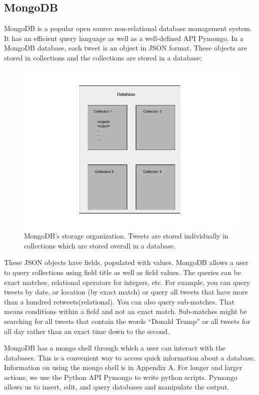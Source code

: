 \documentclass[11pt, twoside, reqno]{book}
\begin{document}
\subsection{MongoDB}
\hspace{0.2in} MongoDB is a popular open source non-relational database management system. It has an efficient query language as well as a well-defined API Pymongo. In a MongoDB database, each tweet is an object in JSON format. These objects are stored in collections and the collections are stored in a database\cite{mongo_docs}:

\begin{figure}[H]
	\centering
	\includegraphics[scale=0.5]{database}
	\caption{MongoDB's storage organization. Tweets are stored individually in collections which are stored overall in a database.}
	\label{fig:dbstructure}
\end{figure}

These JSON objects have fields, populated with values. MongoDB allows a user to query collections using field title as well as field values. The queries can be exact matches, relational operators for integers, etc. For example, you can query tweets by date, or location (by exact match) or query all tweets that have more than a hundred retweets(relational). You can also query sub-matches. That means conditions within a field and not an exact match. Sub-matches might be searching for all tweets that contain the words ``Donald Trump'' or all tweets for all day rather than an exact time down to the second\cite{mongo_docs}. 

MongoDB has a mongo shell through which a user can interact with the databases. This is a convenient way to access quick information about a database. Information on using the mongo shell is in Appendix A. For longer and larger actions, we use the Python API Pymongo to write python scripts. Pymongo allows us to insert, edit, and query databases and manipulate the output. 
\end{document}
